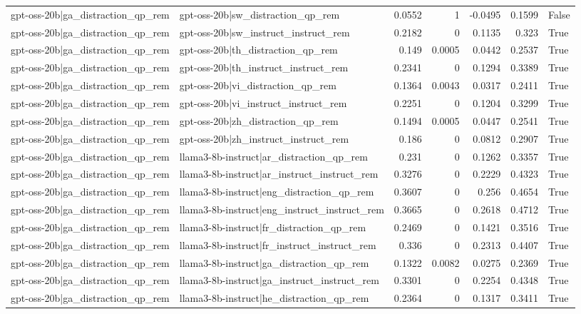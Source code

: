 \begin{table}
\begin{tabular}{l l r r r r l}
gpt-oss-20b|ga_distraction_qp_rem & gpt-oss-20b|sw_distraction_qp_rem & 0.0552 & 1 & -0.0495 & 0.1599 & False \\
gpt-oss-20b|ga_distraction_qp_rem & gpt-oss-20b|sw_instruct_instruct_rem & 0.2182 & 0 & 0.1135 & 0.323 & True \\
gpt-oss-20b|ga_distraction_qp_rem & gpt-oss-20b|th_distraction_qp_rem & 0.149 & 0.0005 & 0.0442 & 0.2537 & True \\
gpt-oss-20b|ga_distraction_qp_rem & gpt-oss-20b|th_instruct_instruct_rem & 0.2341 & 0 & 0.1294 & 0.3389 & True \\
gpt-oss-20b|ga_distraction_qp_rem & gpt-oss-20b|vi_distraction_qp_rem & 0.1364 & 0.0043 & 0.0317 & 0.2411 & True \\
gpt-oss-20b|ga_distraction_qp_rem & gpt-oss-20b|vi_instruct_instruct_rem & 0.2251 & 0 & 0.1204 & 0.3299 & True \\
gpt-oss-20b|ga_distraction_qp_rem & gpt-oss-20b|zh_distraction_qp_rem & 0.1494 & 0.0005 & 0.0447 & 0.2541 & True \\
gpt-oss-20b|ga_distraction_qp_rem & gpt-oss-20b|zh_instruct_instruct_rem & 0.186 & 0 & 0.0812 & 0.2907 & True \\
gpt-oss-20b|ga_distraction_qp_rem & llama3-8b-instruct|ar_distraction_qp_rem & 0.231 & 0 & 0.1262 & 0.3357 & True \\
gpt-oss-20b|ga_distraction_qp_rem & llama3-8b-instruct|ar_instruct_instruct_rem & 0.3276 & 0 & 0.2229 & 0.4323 & True \\
gpt-oss-20b|ga_distraction_qp_rem & llama3-8b-instruct|eng_distraction_qp_rem & 0.3607 & 0 & 0.256 & 0.4654 & True \\
gpt-oss-20b|ga_distraction_qp_rem & llama3-8b-instruct|eng_instruct_instruct_rem & 0.3665 & 0 & 0.2618 & 0.4712 & True \\
gpt-oss-20b|ga_distraction_qp_rem & llama3-8b-instruct|fr_distraction_qp_rem & 0.2469 & 0 & 0.1421 & 0.3516 & True \\
gpt-oss-20b|ga_distraction_qp_rem & llama3-8b-instruct|fr_instruct_instruct_rem & 0.336 & 0 & 0.2313 & 0.4407 & True \\
gpt-oss-20b|ga_distraction_qp_rem & llama3-8b-instruct|ga_distraction_qp_rem & 0.1322 & 0.0082 & 0.0275 & 0.2369 & True \\
gpt-oss-20b|ga_distraction_qp_rem & llama3-8b-instruct|ga_instruct_instruct_rem & 0.3301 & 0 & 0.2254 & 0.4348 & True \\
gpt-oss-20b|ga_distraction_qp_rem & llama3-8b-instruct|he_distraction_qp_rem & 0.2364 & 0 & 0.1317 & 0.3411 & True \\

\end{tabular}
\end{table}
